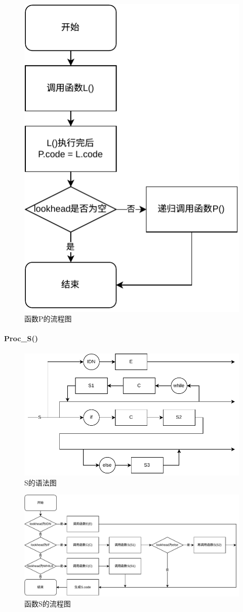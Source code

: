 \documentclass{ctexrep}
\begin{document}
\begin{figure}[htp]
    \centering
    \includegraphics[width = .4\linewidth]{001P.drawio.png.pdf}
    \caption{函数P的流程图}
    \label{fig:proc-p}
\end{figure}
\paragraph{Proc\_S()}

\begin{figure}[htp]
    \centering
    \includegraphics[width = .8\linewidth]{s.drawio.pdf}
    \caption{S的语法图}
    \label{fig:s}
\end{figure}

\begin{figure}[htp]
    \centering
    \includegraphics[width = .8\linewidth]{001S.drawio.png.pdf}
    \caption{函数S的流程图}
    \label{fig:proc-s}
\end{figure}
\end{document}
